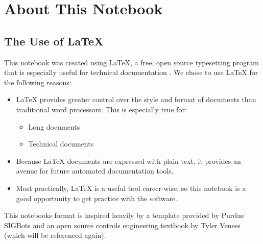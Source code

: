\chapter{About This Notebook}

\section{The Use of \LaTeX{}} This notebook was created using \LaTeX{}, a free,
open source typesetting program that is especially useful for technical
documentation \cite{bib:latex}.  We chose to use \LaTeX{} for the following
reasons:
\begin{itemize}
      \item \LaTeX{} provides greater control over the style and format of
            documents than traditional word processors. This is especially true
            for:
            \begin{itemize}
                  \item Long documents
                  \item Technical documents
            \end{itemize}
      \item Because \LaTeX{} documents are expressed with plain text, it
            provides an avenue for future automated documentation tools.
      \item Most practically, \LaTeX{} is a useful tool career-wise, so this
            notebook is a good opportunity to get practice with the software.
\end{itemize}
This notebooks format is inspired heavily by a template provided by Purdue
SIGBots \cite{bib:purduenotebook} and an open source controls engineering
textbook by Tyler Veness \cite{bib:controlinfrc} (which will be
referenced again).
